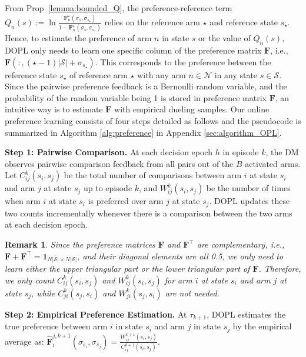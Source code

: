 \documentclass{article} %
\newcommand{\DOPL}{\textsc{DOPL}\xspace}
\newcommand{\I}{\sigma}
\newcommand{\bF}{\mathbf{F}}
\newcommand{\cS}{\mathcal{S}}
\newcommand{\cN}{\mathcal{N}}
\newtheorem{remark}{Remark}
\begin{document}
{From Prop~\ref{lemma:bounded_Q}, the preference-reference term $Q_n(s):=\ln\frac{\bF_n^\star(\I_s, \I_{s_\star})}{1-\bF_n^\star(\I_s, \I_{s_\star})}$ relies on the reference arm $\star$ and reference state $s_\star$. Hence, to estimate the preference of arm $n$ in state $s$ or the value of $Q_n(s)$, \DOPL only needs to learn one specific column of the preference matrix $\bF$, i.e., $\bF(: ,(\star-1)|\cS|+\I_{s_\star})$. This corresponds to the preference between the reference state $s_\star$ of reference arm $\star$ with any arm $n\in\cN$ in any state $s\in\cS$. }
Since the pairwise preference feedback is a Bernoulli random variable, and the probability of the random variable being 1 is stored in preference matrix $\bF$, an intuitive way is to estimate $\bF$ with empirical dueling samples. 
Our online preference learning consists of four steps detailed as follows and the pseudocode is summarized in Algorithm \ref{alg:preference} in Appendix \ref{sec:algorithm_OPL}.


\textbf{Step 1: Pairwise Comparison.} At each decision epoch $h$ in episode $k$, the DM observes pairwise comparison feedback from all pairs out of the $B$ activated arms. Let $C^k_{ij}(s_i,s_j)$ be the total number of comparisons between arm $i$ at state $s_i$ and arm $j$ at state $s_j$ up to episode $k$, and $W^k_{ij}(s_i,s_j)$ be the number of times when arm $i$ at state $s_i$ is preferred over arm $j$ at state $s_j$. \DOPL updates these two counts incrementally whenever there is a comparison between the two arms at each decision epoch. 


\begin{remark}
    Since the preference matrices $\bF$ and $\bF^\intercal$ are complementary, i.e., $\bF+\bF^\intercal=\pmb{1}_{N|\cS|\times N|\cS|}$, and their diagonal elements are all 0.5, we only need to learn either the upper triangular part or the lower triangular part of $\bF$. Therefore, we only count $C^k_{ij}(s_i,s_j)$ and $W^k_{ij}(s_i,s_j)$ for arm $i$ at state $s_i$ and arm $j$ at state $s_j$, while   $C^k_{ji}(s_j,s_i)$ and $W^k_{ji}(s_j,s_i)$ are not needed.
\end{remark}


\textbf{Step 2: Empirical Preference Estimation.} At $\tau_{k+1}$, \DOPL estimates the true preference between arm $i$ in state $s_i$ and arm $j$ in state $s_j$ by the empirical average as: $\hat{\bF}_{i}^{j,k+1}(\I_{s_i}, \I_{s_j})=\frac{W^{k+1}_{ij}(s_i,s_j)}{C^{k+1}_{ij}(s_i, s_j)}$. 
\end{document}
